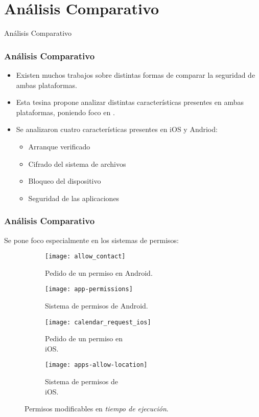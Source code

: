 \section{Análisis Comparativo}
\begin{frame}
 \begin{center}
  \LARGE Análisis Comparativo
 \end{center}
\end{frame}
\begin{frame}
 \frametitle{Análisis Comparativo}
 \begin{itemize}[<+->]
  \item Existen muchos trabajos sobre distintas formas de comparar la seguridad de ambas plataformas.
  \item Esta tesina propone analizar distintas características presentes en ambas plataformas, \pause poniendo foco en .\pause
  \item Se analizaron cuatro características presentes en iOS y Andriod:\pause
     \begin{itemize}[<+->]
      \item Arranque verificado
      \item Cifrado del sistema de archivos
      \item Bloqueo del dispositivo
      \item Seguridad de las aplicaciones
     \end{itemize}
 \end{itemize}
\end{frame}
\begin{frame}
 \frametitle{Análisis Comparativo}
Se pone foco especialmente en los sistemas de permisos:\pause
 \begin{figure}[btp]
    \centering
    \begin{subfigure}{0.23\linewidth}
        \texttt{[image: allow\_contact]}
        \caption{Pedido de un permiso en Android.}
    \end{subfigure}
    \begin{subfigure}{0.23\linewidth}
        \texttt{[image: app-permissions]}
        \caption{Sistema de permisos de Android.}
	\end{subfigure}\pause
	\begin{subfigure}{.23\linewidth}
    	\texttt{[image: calendar\_request\_ios]}
    	\caption{Pedido de un permiso en\\ iOS.}
    \end{subfigure}
    \begin{subfigure}{.23\linewidth}
    	\texttt{[image: apps-allow-location]}
    	\caption{Sistema de permisos de\\ iOS.}
	\end{subfigure}
	\caption{Permisos modificables en \emph{tiempo de ejecución}.}
\end{figure}
\end{frame}
